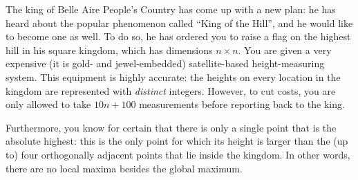 






The king of Belle Aire People's Country has come up with a new plan:
he has heard about the popular phenomenon called ``King of the Hill'',
and he would like to become one as well.
To do so, he has ordered you to raise a flag on the highest hill in his square kingdom,
which has dimensions $n \times n$.
You are given a very expensive (it is gold- and jewel-embedded) satellite-based height-measuring system.
This equipment is highly accurate:
the heights on every location in the kingdom are represented with \emph{distinct} integers.
However, to cut costs, you are only allowed to take $10n+100$ measurements
before reporting back to the king.

Furthermore, you know for certain that there is only a single point that is the absolute highest:
this is the only point for which its height is larger
than the (up to) four orthogonally adjacent points that lie inside the kingdom.
In other words, there are no local maxima besides the global maximum.


